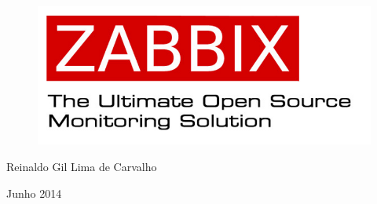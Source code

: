 \thispagestyle{empty}

\begin{center}
  \begin{figure}[H]
    \begin{center}
      \hspace{-1cm}
      \includegraphics[width=0.55\columnwidth]{titlepage}
    \end{center}      
  \end{figure}

  \vskip 4cm

  \hspace{-1cm}
  \begin{minipage}[c]{12cm}
    \begin{center}

{\Huge {}\vskip 0.15cm

{\large Reinaldo Gil Lima de Carvalho}
}
    \end{center}
  \end{minipage}

  \vskip 13cm

  {\Huge Junho 2014}

\end{center}
